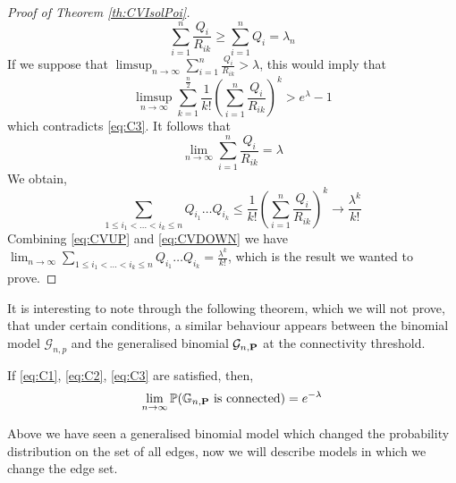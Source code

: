 \begin{proof}[Proof of Theorem \ref{th:CVIsolPoi}]
\begin{equation}
	\sum_{i=1}^n \frac{Q_i}{R_{ik}} \geq \sum_{i=1}^n Q_i = \lambda_n
	\end{equation}
	If we suppose that $\limsup_{n\to \infty} \sum_{i=1}^n \frac{Q_i}{R_{ik}} > \lambda$, 
	this would imply that
	\begin{equation}
		\limsup_{n\to \infty} \sum_{k=1}^{\frac{n}{2}} \frac{1}{k!} (\sum_{i=1}^n \frac{Q_i}{R_{ik}})^k > e^{\lambda} - 1
	\end{equation}
	which contradicts \eqref{eq:C3}.
	It follows that 
	\begin{equation}
		\lim_{n\to\infty} \sum_{i=1}^n \frac{Q_i}{R_{ik}} = \lambda
	\end{equation}
	We obtain, 
	\begin{equation}\label{eq:CVUP}
	\sum_{1 \leq i_1 < \ldots < i_k \leq n} Q_{i_1} \ldots Q_{i_k} \leq \frac{1}{k!} (\sum_{i=1}^n \frac{Q_i}{R_{ik}})^k \longrightarrow \frac{\lambda^k}{k!}
	\end{equation}
	Combining \eqref{eq:CVUP} and \eqref{eq:CVDOWN} we have $\lim_{n\to\infty} \sum_{1 \leq i_1 < \ldots <i_k \leq n} Q_{i_1} \ldots Q_{i_k} = \frac{\lambda^k}{k!}$, which is the result we wanted to prove.
\end{proof}
It is interesting to note through the following theorem, which we will not prove, that under certain conditions, a similar behaviour appears between the binomial model $\mathcal{G}_{n,p}$ and the generalised binomial $\mathcal{G}_{n, \bold{P}}$ at the connectivity threshold.
\begin{theorem}
	If \eqref{eq:C1}, \eqref{eq:C2}, \eqref{eq:C3} are satisfied, then,
	\begin{equation}
		\lim_{n\to \infty} \mathbb{P}(\mathbb{G}_{n, \bold{P}} \text{ is connected}) = e^{-\lambda}
	\end{equation}
\end{theorem}

Above we have seen a generalised binomial model which changed the probability distribution on the set of all edges, now we will describe models in which we change the edge set.
